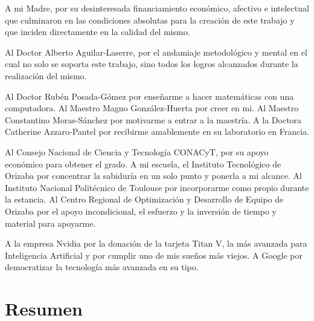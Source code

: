 \documentclass[12pt,oneside,letterpaper]{book}
\begin{document}
A mi Madre, por su desinteresada financiamiento económico, afectivo e
intelectual que culminaron en las condiciones absolutas para la creación de este
trabajo y que inciden directamente en la calidad del mismo.

Al Doctor Alberto Aguilar-Laserre, por el andamiaje metodológico y mental en el
cual no solo se soporta este trabajo, sino todos los logros alcanzados durante
la realización del mismo.

Al Doctor Rubén Posada-Gómez por enseñarme a hacer matemáticas con una
computadora. Al Maestro Magno González-Huerta por creer en mi. Al Maestro
Constantino Moras-Sánchez por motivarme a entrar a la maestría. A la Doctora
Catherine Azzaro-Pantel por recibirme amablemente en su laboratorio en Francia.

Al Consejo Nacional de Ciencia y Tecnología CONACyT, por su apoyo económico para
obtener el grado. A mi escuela, el Instituto Tecnológico de Orizaba por
concentrar la sabiduría en un solo punto y ponerla a mi alcance. Al Instituto
Nacional Politécnico de Toulouse por incorporarme como propio durante la
estancia. Al  Centro Regional de Optimización y Desarrollo de Equipo de Orizaba
por el apoyo incondicional, el esfuerzo y la inversión de tiempo y material para
apoyarme.

A la empresa Nvidia por la donación de la tarjeta Titan V, la más avanzada para
Inteligencia Artificial y por cumplir uno de mis sueños más viejos. A Google por
democratizar la tecnología más avanzada en su tipo. 

\frontmatter 
{}
\chapter*{Resumen}


% 

\pagestyle{fancy}

\setcounter{secnumdepth}{4}
\setcounter{tocdepth}{3}
\renewcommand{\contentsname}{Contenido}
\tableofcontents
\listoffigures
\listoftables
\listofalgorithms{}
\listofmyequations{}
\pagestyle{fancy}

\hypertarget{abbr}{\printnomenclature{}}
\mainmatter{}
\end{document}
